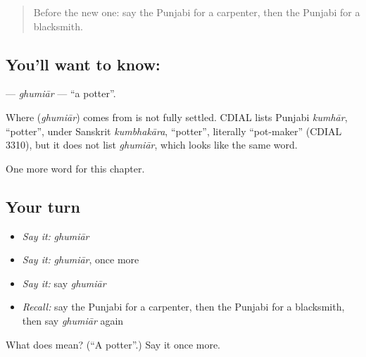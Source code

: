 \label{lesson:PA-C139-ghumiar}



\begin{quote}
Before the new one: say the Punjabi for a carpenter, then the Punjabi for a blacksmith.
\end{quote}

\subsection*{You'll want to know: }
\textbf{} — \emph{ghumiār} — \textquotedblleft{}a potter\textquotedblright{}.

\begin{cousinweb}
Where \textbf{} (\emph{ghumiār}) comes from is not fully settled. CDIAL lists Punjabi \emph{kumhār}, \textquotedblleft{}potter\textquotedblright{}, under Sanskrit \emph{kumbhakāra}, \textquotedblleft{}potter\textquotedblright{}, literally \textquotedblleft{}pot-maker\textquotedblright{} (CDIAL 3310), but it does not list \emph{ghumiār}, which looks like the same word.
\end{cousinweb}

\begin{grammarlens}[title={What you've built}]
One more word for this chapter.
\end{grammarlens}

\subsection*{Your turn}
\begin{itemize}
\raggedright
  \item \emph{Say it:} \emph{ghumiār}
  \item \emph{Say it:} \emph{ghumiār}, once more
  \item \emph{Say it:} say \emph{ghumiār}
  \item \emph{Recall:} say the Punjabi for a carpenter, then the Punjabi for a blacksmith, then say \emph{ghumiār} again
\end{itemize}

\begin{tcolorbox}[breakable,colback=teal!4,colframe=teal!35!black,title={Before you move on}]
What does  mean? (\textquotedblleft{}A potter\textquotedblright{}.) Say it once more.
\end{tcolorbox}

